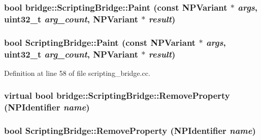 \hypertarget{classbridge_1_1_scripting_bridge_a44eeaa7c1de524f8df7f218c1b53233b}{
\subsubsection[{Paint}]{\setlength{\rightskip}{0pt plus 5cm}bool bridge::ScriptingBridge::Paint (const NPVariant $\ast$ {\em args}, \/  uint32\_\-t {\em arg\_\-count}, \/  NPVariant $\ast$ {\em result})}}
\label{classbridge_1_1_scripting_bridge_a44eeaa7c1de524f8df7f218c1b53233b}
\hypertarget{classbridge_1_1_scripting_bridge_abfdee6fdc6c4f0cc6007425a14e8384e}{
\subsubsection[{Paint}]{\setlength{\rightskip}{0pt plus 5cm}bool ScriptingBridge::Paint (const NPVariant $\ast$ {\em args}, \/  uint32\_\-t {\em arg\_\-count}, \/  NPVariant $\ast$ {\em result})}}
\label{classbridge_1_1_scripting_bridge_abfdee6fdc6c4f0cc6007425a14e8384e}


Definition at line 58 of file scripting\_\-bridge.cc.

\hypertarget{classbridge_1_1_scripting_bridge_aeda2f5f7f5669003d573cdc2f3dc8fe8}{
\subsubsection[{RemoveProperty}]{\setlength{\rightskip}{0pt plus 5cm}virtual bool bridge::ScriptingBridge::RemoveProperty (NPIdentifier {\em name})}}
\label{classbridge_1_1_scripting_bridge_aeda2f5f7f5669003d573cdc2f3dc8fe8}
\hypertarget{classbridge_1_1_scripting_bridge_a861437163b8291eb7b302ce8f778022d}{
\subsubsection[{RemoveProperty}]{\setlength{\rightskip}{0pt plus 5cm}bool ScriptingBridge::RemoveProperty (NPIdentifier {\em name})}}
\label{classbridge_1_1_scripting_bridge_a861437163b8291eb7b302ce8f778022d}


